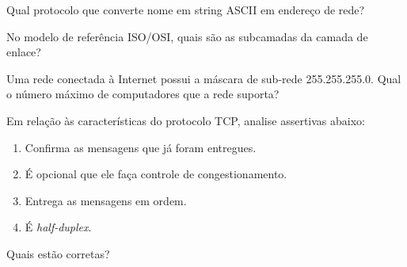 \documentclass[10pt,a4paper]{article}
\begin{document}
%
{
\def\AMCbeginQuestion#1#2{\par\noindent{\bf (POSCOMP 2018 - Questão 65)}}
\begin{question}{} Qual protocolo que converte nome em string ASCII em endereço de rede?
\begin{choices}
\end{choices}
\end{question}
}
%
{
\def\AMCbeginQuestion#1#2{\par\noindent{\bf (POSCOMP 2019 - Questão 54)}}
\begin{question}{} No modelo de referência ISO/OSI, quais são as subcamadas da camada de enlace?
\begin{choices}
\end{choices}
\end{question}
}
%
{
\def\AMCbeginQuestion#1#2{\par\noindent{\bf (POSCOMP 2019 - Questão 60)}}
\begin{question}{} Uma rede conectada à Internet possui a máscara de sub-rede 255.255.255.0. Qual o número máximo de computadores que a rede suporta?
\begin{choices}
\end{choices}
\end{question}
}
%
{
\def\AMCbeginQuestion#1#2{\par\noindent{\bf (POSCOMP 2019 - Questão 65)}}
\begin{question}{} Em relação às características do protocolo TCP, analise assertivas abaixo:
\begin{enumerate}[label=\Roman*.]
\item Confirma as mensagens que já foram entregues.
\item É opcional que ele faça controle de congestionamento.
\item Entrega as mensagens em ordem.
\item É \textit{half-duplex}.
\end{enumerate}
Quais estão corretas?
\begin{choices}
\end{choices}
\end{question}
}
\end{document}
